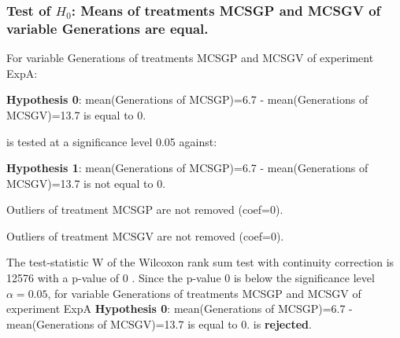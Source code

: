 \begin{frame}[t]
 \frametitle{Test of $H_{0}$: Means of treatments MCSGP and MCSGV of variable Generations are equal. }
 \scriptsize
 For variable Generations of treatments MCSGP and MCSGV of experiment ExpA:

\vspace{1mm}
{\bf Hypothesis 0}: mean(Generations of MCSGP)=6.7 - mean(Generations of MCSGV)=13.7 is equal to 0.


 \begin{center} is tested at a significance level 0.05 against: \end{center}

{\bf Hypothesis 1}: mean(Generations of MCSGP)=6.7 - mean(Generations of MCSGV)=13.7 is not equal to 0.
\vspace{1mm}
\vspace{1mm}

 Outliers of treatment MCSGP  are not removed (coef=0).

 Outliers of treatment MCSGV  are not removed (coef=0).
\vspace{1mm}
 
 The test-statistic W of the Wilcoxon rank sum test with continuity correction is 12576 with a p-value of 0 .
 Since the p-value 0 is below the significance level $\alpha= 0.05 $,
 for variable Generations of treatments MCSGP and MCSGV of experiment ExpA 
 {\bf Hypothesis 0}: mean(Generations of MCSGP)=6.7 - mean(Generations of MCSGV)=13.7 is equal to 0.
is {\bf rejected}.

 \end{frame}
